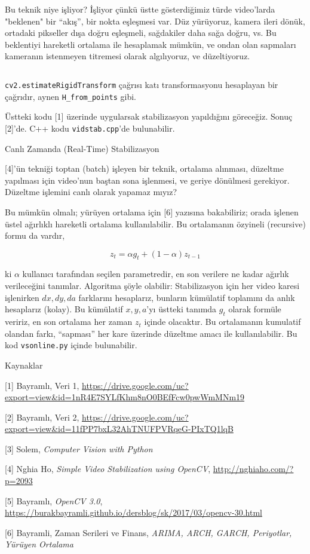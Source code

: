 \documentclass[12pt,fleqn]{article}\usepackage{../../common}
\begin{document}
Bu teknik niye işliyor? İşliyor çünkü üstte gösterdiğimiz türde video'larda
"beklenen" bir ``akış'', bir nokta eşleşmesi var. Düz yürüyoruz, kamera
ileri dönük, ortadaki pikseller dışa doğru eşleşmeli, sağdakiler daha sağa
doğru, vs.  Bu beklentiyi hareketli ortalama ile hesaplamak mümkün, ve
ondan olan sapmaları kameranın istenmeyen titremesi olarak algılıyoruz, ve
düzeltiyoruz.

\inputminted[fontsize=\footnotesize]{python}{vidstab.py}

\verb!cv2.estimateRigidTransform! çağrısı katı transformasyonu hesaplayan
bir çağrıdır, aynen \verb!H_from_points! gibi. 

Üstteki kodu [1] üzerinde uygularsak stabilizasyon yapıldığını
göreceğiz. Sonuç [2]'de. C++ kodu \verb!vidstab.cpp!'de bulunabilir.

Canlı Zamanda (Real-Time) Stabilizasyon

[4]'ün tekniği toptan (batch) işleyen bir teknik, ortalama alınması,
düzeltme yapılması için video'nun baştan sona işlenmesi, ve geriye
dönülmesi gerekiyor. Düzeltme işlemini canlı olarak yapamaz mıyız?

Bu mümkün olmalı; yürüyen ortalama için [6] yazısına bakabiliriz;
orada işlenen üstel ağırlıklı hareketli ortalama kullanılabilir. Bu
ortalamanın özyineli (recursive) formu da vardır,

$$ z_t = \alpha g_t + (1-\alpha) z_{t-1}$$

ki $\alpha$ kullanıcı tarafından seçilen parametredir, en son verilere ne
kadar ağırlık verileceğini tanımlar. Algoritma şöyle olabilir:
Stabilizasyon için her video karesi işlenirken $dx,dy,da$ farklarını
hesaplarız, bunların kümülatif toplamını da anlık hesaplarız (kolay). Bu
kümülatif $x,y,a$'yı üstteki tanımda $g_t$ olarak formüle veririz, en son
ortalama her zaman $z_t$ içinde olacaktır. Bu ortalamanın kumulatif olandan
farkı, ``sapması'' her kare üzerinde düzeltme amacı ile kullanılabilir. Bu
kod \verb!vsonline.py! içinde bulunabilir.

Kaynaklar

[1] Bayramlı, Veri 1, \url{https://drive.google.com/uc?export=view&id=1nR4E7SYLfKhm8nO0BEfFcw0pwWmMNm19}

[2] Bayramlı, Veri 2, \url{https://drive.google.com/uc?export=view&id=11fPP7bxL32AhTNUFPVRqeG-PIxTQ1lqB}

[3] Solem, {\em Computer Vision with Python}

[4] Nghia Ho, {\em Simple Video Stabilization using OpenCV},
    \url{http://nghiaho.com/?p=2093}

[5] Bayramlı, {\em OpenCV 3.0}, 
    \url{https://burakbayramli.github.io/dersblog/sk/2017/03/opencv-30.html}

[6] Bayramli, Zaman Serileri ve Finans, {\em ARIMA, ARCH, GARCH, Periyotlar, Yürüyen Ortalama}
\end{document}

